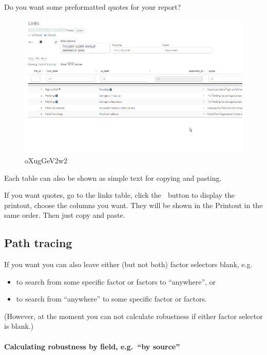 \documentclass[
]{book}
\providecommand{\tightlist}{%
  \setlength{\itemsep}{0pt}\setlength{\parskip}{0pt}}
\begin{document}
Do you want some preformatted quotes for your report?

\begin{figure}
\centering
\includegraphics{_assets/oXugGeV2w2.gif}
\caption{oXugGeV2w2}
\end{figure}

Each table can also be shown as simple text for copying and pasting.

If you want quotes, go to the links table, click the 📘 button to display the printout, choose the columns you want. They will be shown in the Printout in the same order. Then just copy and paste.

\hypertarget{path-tracing}{%
\subsection{Path tracing}\label{path-tracing}}

If you want you can also leave either (but not both) factor selectors blank, e.g.

\begin{itemize}
\tightlist
\item
  to search from some specific factor or factors to ``anywhere'', or
\item
  to search from ``anywhere'' to some specific factor or factors.
\end{itemize}

(However, at the moment you can not calculate robustness if either factor selector is blank.)

\hypertarget{calculating-robustness-by-field-e.g.-by-source}{%
\paragraph{Calculating robustness by field, e.g.~``by source''}\label{calculating-robustness-by-field-e.g.-by-source}}
\end{document}
